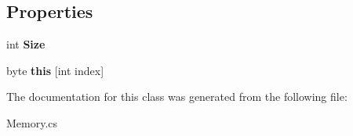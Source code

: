 \subsection*{Properties}
\begin{DoxyCompactItemize}
\item 
\hypertarget{class_eimu_1_1_core_1_1_memory_a3e769833056e8f208d585bf61e38744b}{
int {\bfseries Size}}
\label{class_eimu_1_1_core_1_1_memory_a3e769833056e8f208d585bf61e38744b}

\item 
\hypertarget{class_eimu_1_1_core_1_1_memory_a5e6f8d1809ca8cb69097fe01e6da1752}{
byte {\bfseries this} \mbox{[}int index\mbox{]}}
\label{class_eimu_1_1_core_1_1_memory_a5e6f8d1809ca8cb69097fe01e6da1752}

\end{DoxyCompactItemize}


The documentation for this class was generated from the following file:\begin{DoxyCompactItemize}
\item 
Memory.cs\end{DoxyCompactItemize}
